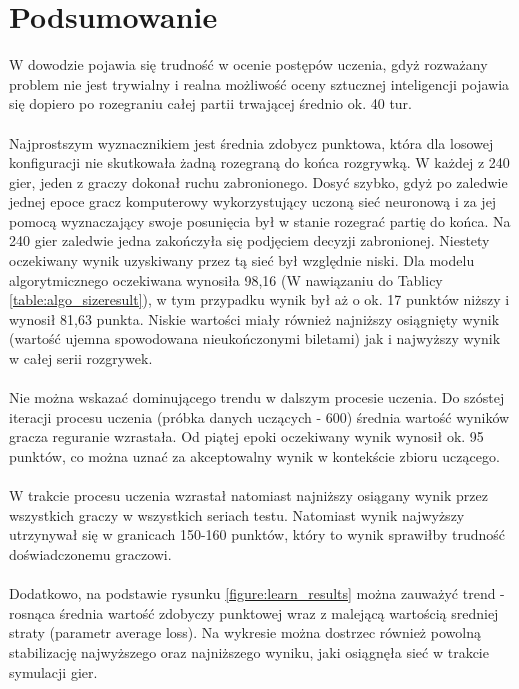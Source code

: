 \documentclass[12pt, oneside]{report}
\begin{document}
\section{Podsumowanie}
W dowodzie pojawia się trudność w ocenie postępów uczenia, gdyż rozważany problem nie jest trywialny i realna możliwość oceny sztucznej inteligencji pojawia się dopiero po rozegraniu całej partii trwającej średnio ok. 40 tur. \\ \\
Najprostszym wyznacznikiem jest średnia zdobycz punktowa, która dla losowej konfiguracji nie skutkowała żadną rozegraną do końca rozgrywką. W każdej z 240 gier, jeden z graczy dokonał ruchu zabronionego. Dosyć szybko, gdyż po zaledwie jednej epoce gracz komputerowy wykorzystujący uczoną sieć neuronową i za jej pomocą wyznaczający swoje posunięcia był w stanie rozegrać partię do końca. Na 240 gier zaledwie jedna zakończyła się podjęciem decyzji zabronionej. Niestety oczekiwany wynik uzyskiwany przez tą sieć był względnie niski. Dla modelu algorytmicznego oczekiwana wynosiła 98,16 (W nawiązaniu do Tablicy \ref{table:algo_sizeresult}), w tym przypadku wynik był aż o ok. 17 punktów niższy i wynosił 81,63 punkta. Niskie wartości miały również najniższy osiągnięty wynik (wartość ujemna spowodowana nieukończonymi biletami) jak i najwyższy wynik w całej serii rozgrywek. \\ \\
Nie można wskazać dominującego trendu w dalszym procesie uczenia. Do szóstej iteracji procesu uczenia (próbka danych uczących - 600) średnia wartość wyników gracza reguranie wzrastała. Od piątej epoki oczekiwany wynik wynosił ok. 95 punktów, co można uznać za akceptowalny wynik w kontekście zbioru uczącego. \\ \\ W trakcie procesu uczenia wzrastał natomiast najniższy osiągany wynik przez wszystkich graczy w wszystkich seriach testu. Natomiast wynik najwyższy utrzynywał się w granicach 150-160 punktów, który to wynik sprawiłby trudność doświadczonemu graczowi. \\ \\
Dodatkowo, na podstawie rysunku \ref{figure:learn_results} można zauważyć trend - rosnąca średnia wartość zdobyczy punktowej wraz z malejącą wartością sredniej straty (parametr average loss). Na wykresie można dostrzec również powolną stabilizację najwyższego oraz najniższego wyniku, jaki osiągnęła sieć w trakcie symulacji gier.
\end{document}
